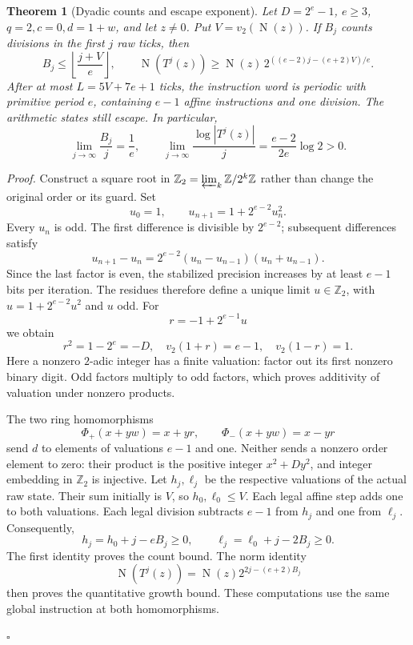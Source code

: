 \documentclass[11pt,letterpaper]{article}
\newcommand{\Z}{\mathbb{Z}}
\newtheorem{theorem}{Theorem}
\newenvironment{proof}{\noindent\textit{Proof.}}{\hfill\(\square\)}
\newcommand{\OrderNorm}{\operatorname{N}}
\newcommand{\RawMap}{T}
\begin{document}
\begin{theorem}[Dyadic counts and escape exponent]
Let \(D=2^e-1\), \(e\ge3\), \(q=2,c=0,d=1+w\), and let
\(z\ne0\). Put \(V=v_2(\OrderNorm(z))\). If \(B_j\) counts divisions
in the first \(j\) raw ticks, then
\[
B_j\le\left\lfloor\frac{j+V}{e}\right\rfloor,
\qquad
\OrderNorm(\RawMap^j(z))\ge
\OrderNorm(z)\,2^{((e-2)j-(e+2)V)/e}.
\]
After at most \(L=5V+7e+1\) ticks, the instruction word is periodic
with primitive period \(e\), containing \(e-1\) affine instructions
and one division. The arithmetic states still escape. In particular,
\[
\lim_{j\to\infty}\frac{B_j}{j}=\frac1e,
\qquad
\lim_{j\to\infty}\frac{\log|\RawMap^j(z)|}{j}
=\frac{e-2}{2e}\log2>0.
\]
\end{theorem}
\begin{proof}
Construct a square root in \(\Z_2=\varprojlim_k\Z/2^k\Z\) rather than
change the original order or its guard. Set
\[
u_0=1,\qquad u_{n+1}=1+2^{e-2}u_n^2.
\]
Every \(u_n\) is odd. The first difference is divisible by
\(2^{e-2}\); subsequent differences satisfy
\[
u_{n+1}-u_n=2^{e-2}(u_n-u_{n-1})(u_n+u_{n-1}).
\]
Since the last factor is even, the stabilized precision increases
by at least \(e-1\) bits per iteration. The residues therefore define
a unique limit \(u\in\Z_2\), with
\(u=1+2^{e-2}u^2\) and \(u\) odd. For
\[
r=-1+2^{e-1}u
\]
we obtain
\[
r^2=1-2^e=-D,\quad v_2(1+r)=e-1,\quad v_2(1-r)=1.
\]
Here a nonzero \(2\)-adic integer has a finite valuation: factor out
its first nonzero binary digit. Odd factors multiply to odd factors,
which proves additivity of valuation under nonzero products.

The two ring homomorphisms
\[
\Phi_+(x+yw)=x+yr,\qquad \Phi_-(x+yw)=x-yr
\]
send \(d\) to elements of valuations \(e-1\) and one. Neither sends
a nonzero order element to zero: their product is the positive
integer \(x^2+Dy^2\), and integer embedding in \(\Z_2\) is injective.
Let \(h_j,\ell_j\) be the respective valuations of the actual raw
state. Their sum initially is \(V\), so \(h_0,\ell_0\le V\).
Each legal affine step adds one to both valuations. Each legal
division subtracts \(e-1\) from \(h_j\) and one from \(\ell_j\).
Consequently,
\[
h_j=h_0+j-eB_j\ge0,\qquad
\ell_j=\ell_0+j-2B_j\ge0.
\]
The first identity proves the count bound. The norm identity
\[
\OrderNorm(\RawMap^j(z))=\OrderNorm(z)2^{2j-(e+2)B_j}
\]
then proves the quantitative growth bound. These computations use the
same global instruction at both homomorphisms.


\end{proof}
\end{document}
